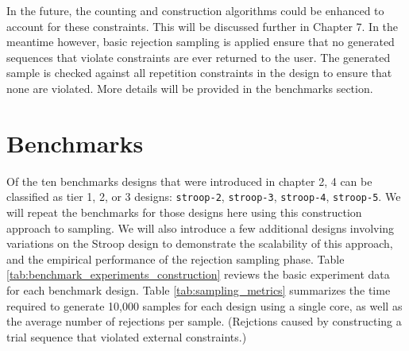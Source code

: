 In the future, the counting and construction algorithms could be enhanced to account for these constraints. This will be discussed further in Chapter 7. In the meantime however, basic rejection sampling is applied ensure that no generated sequences that violate constraints are ever returned to the user. The generated sample is checked against all repetition constraints in the design to ensure that none are violated. More details will be provided in the benchmarks section.


\section{Benchmarks}

Of the ten benchmarks designs that were introduced in chapter 2, 4 can be classified as tier 1, 2, or 3 designs: \texttt{stroop-2}, \texttt{stroop-3}, \texttt{stroop-4}, \texttt{stroop-5}. We will repeat the benchmarks for those designs here using this construction approach to sampling. We will also introduce a few additional designs involving variations on the Stroop design to demonstrate the scalability of this approach, and the empirical performance of the rejection sampling phase. Table \ref{tab:benchmark_experiments_construction} reviews the basic experiment data for each benchmark design. Table \ref{tab:sampling_metrics} summarizes the time required to generate 10,000 samples for each design using a single core, as well as the average number of rejections per sample. (Rejctions caused by constructing a trial sequence that violated external constraints.)


